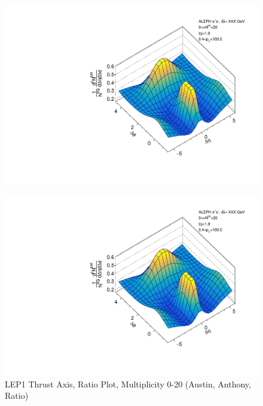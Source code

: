 \begin{figure}[htbp]
  \caption{LEP1 Thrust Axis, Ratio Plot, Multiplicity 0-20 (Austin, Anthony, Ratio)}
  \begin{minipage}[b]{0.32\linewidth}
    \centering
    \includegraphics[width=\linewidth]{images/TwoParticleCorrelation/LEP1_THRUST/LEP1_THRUST_ratio1_0_20.pdf}  
    \label{fig:LEP1 Thrust Axis, Ratio Plot, Multiplicity 0-20, Austin}
  \end{minipage}
  \hspace{0.0cm}
  \begin{minipage}[b]{0.32\linewidth}
    \centering
    \includegraphics[width=\linewidth]{images/TwoParticleCorrelation/LEP1_THRUST/LEP1_THRUST_ratio2_0_20.pdf}

\end{minipage}
\end{figure}
